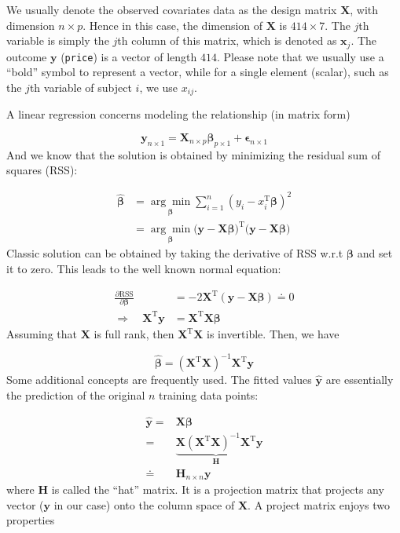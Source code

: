 \documentclass[
]{book}
\theoremstyle{definition}
\theoremstyle{definition}
\theoremstyle{definition}
\theoremstyle{definition}
\theoremstyle{remark}
\begin{document}
We usually denote the observed covariates data as the design matrix \(\mathbf{X}\), with dimension \(n \times p\). Hence in this case, the dimension of \(\mathbf{X}\) is \(414 \times 7\). The \(j\)th variable is simply the \(j\)th column of this matrix, which is denoted as \(\mathbf{x}_j\). The outcome \(\mathbf{y}\) (\texttt{price}) is a vector of length \(414\). Please note that we usually use a ``bold'' symbol to represent a vector, while for a single element (scalar), such as the \(j\)th variable of subject \(i\), we use \(x_{ij}\).

A linear regression concerns modeling the relationship (in matrix form)

\[\mathbf{y}_{n \times 1} = \mathbf{X}_{n \times p} \boldsymbol \beta_{p \times 1} + \boldsymbol \epsilon_{n \times 1}\]
And we know that the solution is obtained by minimizing the residual sum of squares (RSS):

\[ 
\begin{align}
\widehat{\boldsymbol \beta} &= \underset{\boldsymbol \beta}{\arg\min} \sum_{i=1}^n \left(y_i - x_i^\text{T}\boldsymbol \beta\right)^2 \\
&= \underset{\boldsymbol \beta}{\arg\min} \big( \mathbf y - \mathbf{X} \boldsymbol \beta \big)^\text{T}\big( \mathbf y - \mathbf{X} \boldsymbol \beta \big)
\end{align}
\]
Classic solution can be obtained by taking the derivative of RSS w.r.t \(\boldsymbol \beta\) and set it to zero. This leads to the well known normal equation:

\[
\begin{align}
    \frac{\partial \text{RSS}}{\partial \boldsymbol \beta} &= -2 \mathbf{X}^\text{T}(\mathbf{y}- \mathbf{X}\boldsymbol \beta) \doteq 0 \\
    \Longrightarrow \quad \mathbf{X}^\text{T}\mathbf{y}&= \mathbf{X}^\text{T}\mathbf{X}\boldsymbol \beta
\end{align}
\]
Assuming that \(\mathbf{X}\) is full rank, then \(\mathbf{X}^\text{T}\mathbf{X}\) is invertible. Then, we have

\[
\widehat{\boldsymbol \beta} = (\mathbf{X}^\text{T}\mathbf{X})^{-1}\mathbf{X}^\text{T}\mathbf{y}
\]
Some additional concepts are frequently used. The fitted values \(\widehat{\mathbf{y}}\) are essentially the prediction of the original \(n\) training data points:

\[ 
\begin{align}
\widehat{\mathbf{y}} =& \mathbf{X}\boldsymbol \beta\\
=& \underbrace{\mathbf{X}(\mathbf{X}^\text{T}\mathbf{X})^{-1}\mathbf{X}^\text{T}}_{\mathbf{H}} \mathbf{y}\\
\doteq& \mathbf{H}_{n \times n} \mathbf{y}
\end{align}
\]
where \(\mathbf{H}\) is called the ``hat'' matrix. It is a projection matrix that projects any vector (\(\mathbf{y}\) in our case) onto the column space of \(\mathbf{X}\). A project matrix enjoys two properties
\end{document}
